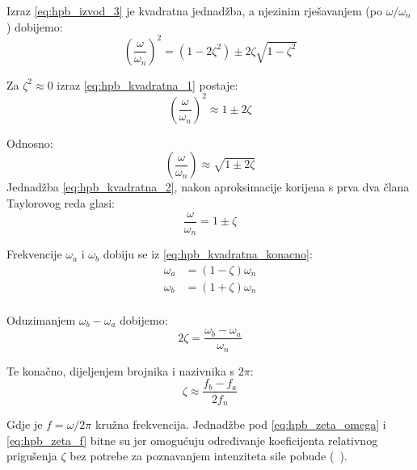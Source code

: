 Izraz \eqref{eq:hpb_izvod_3} je kvadratna jednadžba, a njezinim rješavanjem (po
$\omega/\omega_n$) dobijemo:
\begin{equation}\label{eq:hpb_kvadratna_1}
    \left(\frac{\omega}{\omega_n}\right)^2 = 
        (1-2\zeta^2)\pm 2\zeta\sqrt{1-\zeta^2}
\end{equation}

Za $\zeta^2 \approx 0$ izraz \eqref{eq:hpb_kvadratna_1} postaje:
\begin{equation}
    \left(\frac{\omega}{\omega_n}\right)^2 \approx
        1 \pm 2\zeta
\end{equation}

Odnosno:
\begin{equation}\label{eq:hpb_kvadratna_2}
    \left(\frac{\omega}{\omega_n}\right)\approx
        \sqrt{1 \pm 2\zeta}
\end{equation}
Jednadžba \eqref{eq:hpb_kvadratna_2}, nakon aproksimacije korijena s prva dva člana Taylorovog
reda glasi:
\begin{equation}\label{eq:hpb_kvadratna_konacno}
    \frac{\omega}{\omega_n} = 1 \pm \zeta
\end{equation}

Frekvencije $\omega_a$ i $\omega_b$ dobiju se iz \eqref{eq:hpb_kvadratna_konacno}:
\begin{align}
    \omega_a &= (1-\zeta)\omega_n\\
    \omega_b &= (1+\zeta)\omega_n\\
\end{align}

Oduzimanjem $\omega_b-\omega_a$ dobijemo:
\begin{equation}\label{eq:hpb_zeta_omega}
        2\zeta = \frac{\omega_b-\omega_a}{\omega_n}
\end{equation}

Te konačno, dijeljenjem brojnika i nazivnika s $2\pi$:
\begin{equation}\label{eq:hpb_zeta_f}
    \zeta\approx\frac{f_b-f_a}{2f_n}
\end{equation}

Gdje je $f=\omega/2\pi$ kružna frekvencija. Jednadžbe pod \eqref{eq:hpb_zeta_omega}
i \eqref{eq:hpb_zeta_f} bitne su jer omogućuju određivanje koeficijenta relativnog prigušenja
$\zeta$ bez potrebe za poznavanjem intenziteta sile pobude (~\cite{chopra2011}). 


